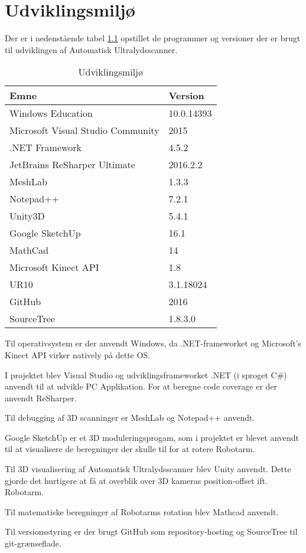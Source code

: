 \chapter{Udviklingsmiljø}\label{Udvikling}
Der er i nedenstående tabel \ref{Udvikling} opstillet de programmer og versioner der er brugt til udviklingen af Automatisk Ultralydsscanner. 

\begin{table}[htb]
\centering
\begin{tabular}{| l | p{}| }
\hline
\textbf{Emne} & \textbf{Version} \\\hline
Windows Education & 10.0.14393 \\\hline
Microsoft Visual Studio Community & 2015 \\\hline
.NET Framework & 4.5.2 \\\hline
JetBrains ReSharper Ultimate & 2016.2.2\\\hline
MeshLab & 1.3.3 \\\hline
Notepad++ & 7.2.1 \\\hline
Unity3D & 5.4.1 \\\hline
Google SketchUp & 16.1 \\\hline
MathCad & 14 \\\hline
Microsoft Kinect API & 1.8 \\\hline
UR10 & 3.1.18024 \\\hline
GitHub & 2016\\\hline
SourceTree & 1.8.3.0 \\\hline

\end{tabular}
\caption{Udviklingsmiljø}
\label{Udvikling}
\end{table}
Til operativsystem er der anvendt Windows, da .NET-frameworket og Microsoft's Kinect API virker natively på dette OS.

I projektet blev Visual Studio og udviklingsframeworket .NET (i sproget C\#) anvendt til at udvikle PC Applikation. For at beregne code coverage er der anvendt ReSharper.

Til debugging af 3D scanninger er MeshLab og Notepad++ anvendt. 

Google SketchUp er et 3D moduleringsprogam, som i projektet er blevet anvendt til at visualisere de beregninger der skulle til for at rotere Robotarm.

Til 3D visualisering af Automatisk Ultralydsscanner blev Unity anvendt. Dette gjorde det hurtigere at få at overblik over 3D kameras position-offset ift. Robotarm.

Til matematiske beregninger af Robotarms rotation blev Mathcad anvendt.

Til versionsstyring er der brugt GitHub som repository-hosting og SourceTree til git-grænseflade.

